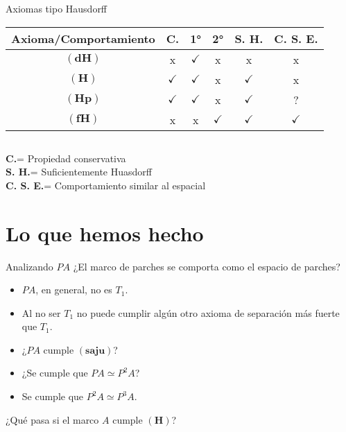 \documentclass[compress,12pt]{beamer}
\begin{document}
\begin{frame}{Axiomas tipo Hausdorff}
\begin{center}
\begin{tabular}{| c | c | c | c | c | c |}
\hline
 Axioma/Comportamiento & \textbf{C.} & 1° & 2° & \textbf{S. H.} & \textbf{C. S. E.}\\ \hline
$\mathbf{(dH)}$ & x & $\checkmark$ & x & x & x \\ \hline
$\mathbf{(H)}$ & $\checkmark$ & $\checkmark$ & x & $\checkmark$ & x \\ \hline
$\mathbf{(Hp)}$ & $\checkmark$ & $\checkmark$ & x & $\checkmark$ & ? \\ \hline
$\mathbf{(fH)}$ & x & x &  $\checkmark$ & $\checkmark$ & $\checkmark$ \\ \hline
\end{tabular}
\end{center}
\begin{tiny}
$$\mbox{ }$$
\end{tiny}

\textbf{C.}= Propiedad conservativa\\
\textbf{S. H.}= Suficientemente Huasdorff\\
\textbf{C. S. E.}= Comportamiento similar al espacial

\end{frame}

\section{Lo que hemos hecho}
\begin{frame}{Analizando $PA$}
¿El marco de parches se comporta como el espacio de parches?
\begin{itemize}
	\item $PA$, en general, no es  $T_1$.
	\item Al no ser $T_1$ no puede cumplir algún otro axioma de separación más fuerte que $T_1$.
	\item ¿$PA$ cumple $\mathbf{(saju)}$?
	\item ¿Se cumple que $PA\simeq P^2A$?
	\item Se cumple que $P^2A\simeq P^3A$.
\end{itemize}
¿Qué pasa si el marco $A$ cumple $\mathbf{(H)}$?
\end{frame}
\end{document}
